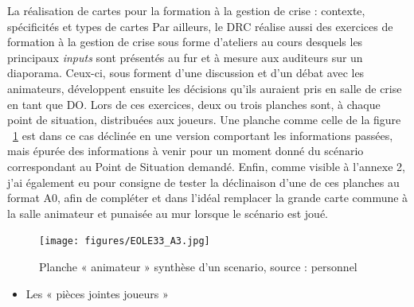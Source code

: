 \documentclass[10pt,a4paper]{report} %
\begin{document}
\begin{part}{La réalisation de cartes pour la formation à la gestion de crise : contexte, spécificités et types de cartes}
Par ailleurs, le DRC réalise aussi des exercices de formation à la gestion de crise sous forme d’ateliers au cours desquels les principaux \textit{inputs} sont présentés au fur et à mesure aux auditeurs sur un diaporama. Ceux-ci, sous forment d’une discussion et d’un débat avec les animateurs, développent ensuite les décisions qu’ils auraient pris en salle de crise en tant que DO. Lors de ces exercices, deux ou trois planches sont, à chaque point de situation, distribuées aux joueurs. Une planche comme celle de la figure ~\ref{fig9} est dans ce cas déclinée en une version comportant les informations passées, mais épurée des informations à venir pour un moment donné du scénario correspondant au Point de Situation demandé. Enfin, comme visible à l’annexe 2, j’ai également eu pour consigne de tester la déclinaison d’une de ces planches au format A0, afin de compléter et dans l’idéal remplacer la grande carte commune à la salle animateur et punaisée au mur lorsque le scénario est joué.
\newline
\begin{figure}[p]
    \centering
    \texttt{[image: figures/EOLE33\_A3.jpg]}
    \caption{Planche « animateur » synthèse d’un scenario, source : personnel}
    \label{fig9}
\end{figure}

\begin{itemize}
    \item Les « pièces jointes joueurs »
\end{itemize}


\end{part}
\end{document}
